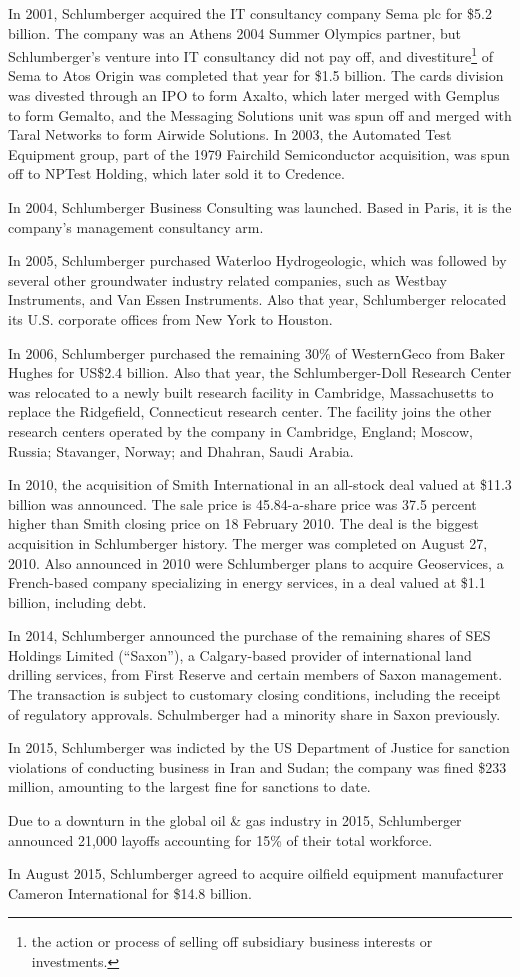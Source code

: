 \documentclass[12pt,a4paper]{article}
\begin{document}
In 2001, Schlumberger acquired the IT consultancy company Sema plc for \$5.2
billion. The company was an Athens 2004 Summer Olympics partner, but
Schlumberger's venture into IT consultancy did not pay off, and
divestiture\footnote{the action or process of selling off subsidiary
  business interests or investments.} of Sema to Atos Origin was completed
that year for \$1.5 billion. The cards division was divested through an IPO
to form Axalto, which later merged with Gemplus to form Gemalto, and the
Messaging Solutions unit was spun off and merged with Taral Networks to form
Airwide Solutions. In 2003, the Automated Test Equipment group, part of the
1979 Fairchild Semiconductor acquisition, was spun off to NPTest Holding,
which later sold it to Credence.

In 2004, Schlumberger Business Consulting was launched. Based in Paris, it
is the company's management consultancy arm.

In 2005, Schlumberger purchased Waterloo Hydrogeologic, which was followed
by several other groundwater industry related companies, such as Westbay
Instruments, and Van Essen Instruments. Also that year, Schlumberger
relocated its U.S. corporate offices from New York to Houston.

In 2006, Schlumberger purchased the remaining 30\% of WesternGeco from Baker
Hughes for US\$2.4 billion. Also that year, the Schlumberger-Doll
Research Center was relocated to a newly built research facility in
Cambridge, Massachusetts to replace the Ridgefield, Connecticut research
center. The facility joins the other research centers operated by the
company in Cambridge, England; Moscow, Russia; Stavanger, Norway; and
Dhahran, Saudi Arabia.

In 2010, the acquisition of Smith International in an all-stock deal valued
at \$11.3 billion was announced. The sale price is 45.84-a-share price was
37.5 percent higher than Smith closing price on 18 February 2010. The deal
is the biggest acquisition in Schlumberger history. The merger was
completed on August 27, 2010. Also announced in 2010 were Schlumberger
plans to acquire Geoservices, a French-based company specializing in energy
services, in a deal valued at \$1.1 billion, including debt.

In 2014, Schlumberger announced the purchase of the remaining shares of SES
Holdings Limited (``Saxon''), a Calgary-based provider of international land
drilling services, from First Reserve and certain members of Saxon
management. The transaction is subject to customary closing conditions,
including the receipt of regulatory approvals. Schulmberger had a minority
share in Saxon previously.

In 2015, Schlumberger was indicted by the US Department of Justice for
sanction violations of conducting business in Iran and Sudan; the company
was fined \$233 million, amounting to the largest fine for sanctions to
date.

Due to a downturn in the global oil \& gas industry in 2015, Schlumberger
announced 21,000 layoffs accounting for 15\% of their total workforce.

In August 2015, Schlumberger agreed to acquire oilfield equipment
manufacturer Cameron International for \$14.8 billion.

 
 
\end{document}
